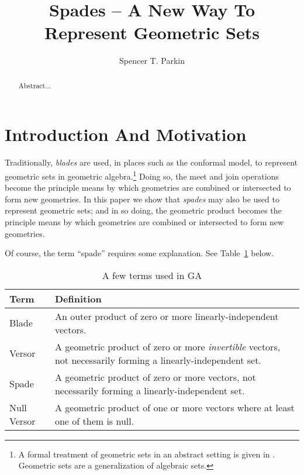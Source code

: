 \documentclass{birkjour}
\theoremstyle{definition}
\theoremstyle{remark}
\numberwithin{equation}{section}
\begin{document}
\title{Spades -- A New Way To Represent Geometric Sets}

\author{Spencer T. Parkin}



\begin{abstract}
Abstract...
\end{abstract}


\maketitle

\section{Introduction And Motivation}

Traditionally, \emph{blades} are used, in places such as the conformal model, to represent geometric sets in geometric algebra.\footnote{A formal
treatment of geometric sets in an abstract setting is given in \cite{Parkin15}.  Geometric sets are a generalization of algebraic sets.}  Doing so,
the meet and join operations become the principle
means by which geometries are combined or intersected to form new geometries.  In this paper we show that \emph{spades} may also be used
to represent geometric sets; and in so doing, the geometric product becomes the principle means by which geometries are combined or intersected
to form new geometries.

Of course, the term ``spade'' requires some explanation. See Table~\ref{tbl_terms} below.

\begin{table}[H]\label{tbl_terms}\caption{A few terms used in GA}
\begin{tabular}{p{2cm}p{9cm}}
Term & Definition \\
\hline
Blade & An outer product of zero or more linearly-independent vectors. \\
Versor & A geometric product of zero or more \emph{invertible} vectors, not necessarily forming a linearly-independent set. \\
Spade & A geometric product of zero or more vectors, not necessarily forming a linearly-independent set.\\
Null Versor & A geometric product of one or more vectors where at least one of them is null.\\
\end{tabular}
\end{table}
\end{document}
